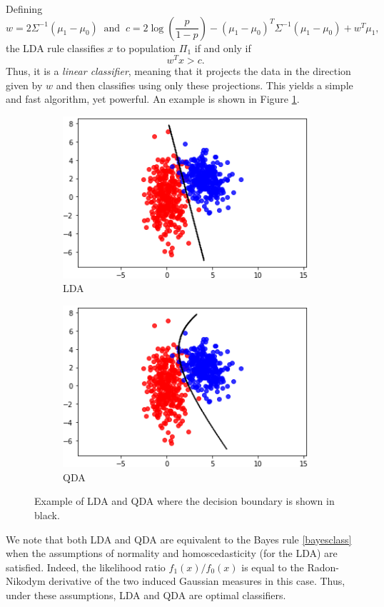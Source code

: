 \documentclass[10pt, a4paper]{report}
\theoremstyle{definition}
\theoremstyle{remark}
\begin{document}
Defining 
$$w = 2\Sigma^{-1}(\mu_1-\mu_0) \ \text{ and } \ c = 2\log\left(\frac{p}{1-p}\right) - (\mu_1-\mu_0)^T\Sigma^{-1} (\mu_1-\mu_0) + w^T\mu_1,$$
the LDA rule classifies $x$ to population $\Pi_1$ if and only if
$$w^Tx>c.$$
Thus, it is a \emph{linear classifier}, meaning that it projects the data in the direction given by $w$ and then classifies using only these projections. This yields a simple and fast algorithm, yet powerful. An example is shown in Figure \ref{fig:LQDAex}.
\begin{figure}[H]
	\centering
	\begin{subfigure}{.5\textwidth}
		\centering
		\includegraphics[width=.8\linewidth]{Code/images/42/LDAex}
		\caption{LDA}
	\end{subfigure}%
	\begin{subfigure}{.5\textwidth}
		\centering
		\includegraphics[width=.8\linewidth]{Code/images/42/QDAex}
		\caption{QDA}
	\end{subfigure}
	\caption{Example of LDA and QDA where the decision boundary is shown in black.}
	\label{fig:LQDAex}
\end{figure}
We note that both LDA and QDA are equivalent to the Bayes rule \ref{bayesclass} when the assumptions of normality and homoscedasticity (for the LDA) are satisfied. Indeed, the likelihood ratio $f_1(x)/f_0(x)$ is equal to the Radon-Nikodym derivative of the two induced Gaussian measures in this case. Thus, under these assumptions, LDA and QDA are optimal classifiers.
\end{document}
